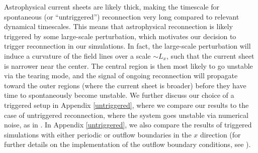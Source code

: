 Astrophysical current sheets are likely thick, making the timescale for spontaneous (or ``untriggered'') reconnection very long compared to relevant dynamical timescales.  This means that astrophysical reconnection is likely triggered by some large-scale perturbation, which motivates our decision to trigger reconnection in our simulations. In fact, the large-scale perturbation will induce a curvature of the field lines over a scale $\sim L_x$, such that the current sheet is narrower near the center. The central region is then most likely to go unstable via the tearing mode, and the signal of ongoing reconnection will propagate toward the outer regions (where the current sheet is broader) before they have time to spontaneously become unstable. We further discuss our choice of a triggered setup in  Appendix \ref{untriggered}, where we compare our results to the case of untriggered reconnection, where the  system goes unstable via numerical noise, as in \citealt{sironi2014}. In Appendix \ref{untriggered}, we also compare the results of triggered simulations with either periodic or outflow boundaries in the $x$ direction (for further details on the implementation of the outflow boundary conditions, see \citealt{sironi2016}).


